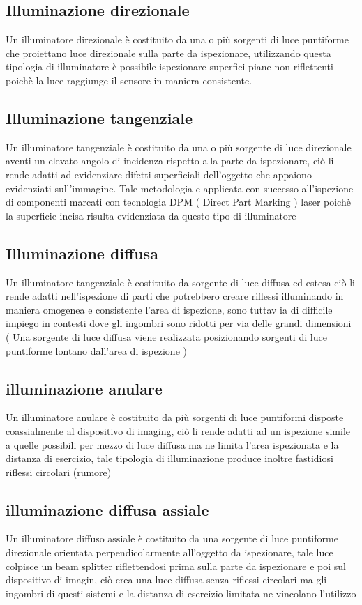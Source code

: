 \subsection{Illuminazione direzionale}

Un illuminatore direzionale è costituito da una o più 
sorgenti di luce puntiforme che proiettano luce direzionale 
sulla parte da ispezionare, utilizzando questa tipologia di 
illuminatore è possibile ispezionare superfici piane non 
riflettenti poichè la luce raggiunge il sensore in maniera 
consistente. 

\subsection{Illuminazione tangenziale}

Un illuminatore tangenziale è costituito da una o più 
sorgente di luce direzionale aventi un elevato angolo di 
incidenza rispetto alla parte da ispezionare, ciò li rende 
adatti ad evidenziare difetti superficiali dell’oggetto che 
appaiono evidenziati sull’immagine.  
Tale metodologia e applicata con successo all’ispezione di 
componenti marcati con tecnologia DPM ( Direct Part 
Marking ) laser poichè la superficie incisa risulta evidenziata 
da questo tipo di illuminatore 

\subsection{Illuminazione diffusa}
Un illuminatore tangenziale è costituito da sorgente di luce 
diffusa ed estesa ciò li rende adatti nell’ispezione di parti 
che potrebbero creare riflessi illuminando in maniera 
omogenea e consistente l’area di ispezione, sono tuttav ia 
di difficile impiego in contesti dove gli ingombri sono 
ridotti per via delle grandi dimensioni ( Una sorgente di 
luce diffusa viene realizzata posizionando sorgenti di luce 
puntiforme lontano dall’area di ispezione )  
 
\subsection{illuminazione anulare}
Un illuminatore anulare è costituito da più sorgenti di luce 
puntiformi disposte coassialmente al dispositivo di 
imaging, ciò li rende adatti ad un ispezione simile a quelle 
possibili per mezzo di luce diffusa ma ne limita l’area 
ispezionata e la distanza di esercizio, tale tipologia di 
illuminazione produce inoltre fastidiosi riflessi circolari 
(rumore) 
 
\subsection{illuminazione diffusa assiale}
Un illuminatore diffuso assiale  è costituito da una 
sorgente di luce puntiforme direzionale orientata 
perpendicolarmente all’oggetto da ispezionare, tale luce 
colpisce un beam splitter riflettendosi prima sulla parte da 
ispezionare e poi sul dispositivo di imagin, ciò crea una 
luce diffusa senza riflessi circolari ma gli  ingombri di 
questi sistemi e la distanza di esercizio limitata ne 
vincolano l’utilizzo 

 
